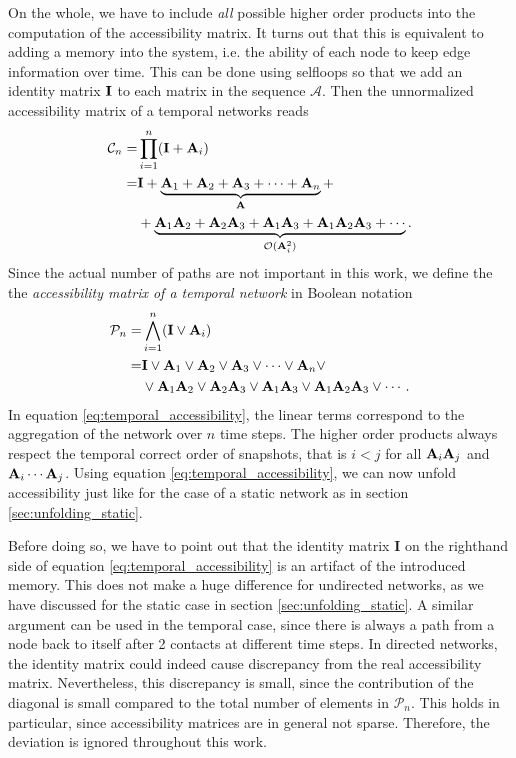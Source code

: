 On the whole, we have to include \emph{all} possible higher order products into the computation of the accessibility matrix.
It turns out that this is equivalent to adding a memory into the system, i.e. the ability of each node to keep edge information over time.
This can be done using selfloops so that we add an identity matrix $\mathbf{I}$ to each matrix in the sequence $\mathcal{A}$.
Then the unnormalized accessibility matrix of a temporal networks reads
%
\begin{align*}
\mathcal{C}_n=&\prod _{i=1} ^n (\mathbf{I} + \mathbf{A}_i ) \\
=& \mathbf{I}+\underbrace{ \mathbf{A}_1+\mathbf{A}_2+\mathbf{A}_3+\cdots + \mathbf{A}_n}_{\mathbf{A}} + \nonumber \\
&+ \underbrace{\mathbf{A}_1\mathbf{A}_2+\mathbf{A}_2\mathbf{A}_3+ \mathbf{A}_1\mathbf{A}_3+ \mathbf{A}_1\mathbf{A}_2\mathbf{A}_3 +\cdots }_{\mathcal{O}(\mathbf{A}_i ^2)}\nonumber .
\end{align*}
Since the actual number of paths are not important in this work, we define the the \emph{accessibility matrix of a temporal network} in Boolean notation
%
\begin{align}
\mathcal{P}_n=&\bigwedge _{i=1} ^n (\mathbf{I} \vee \mathbf{A}_i ) \label{eq:temporal_accessibility} \\
= & \mathbf{I}\vee \mathbf{A}_1\vee \mathbf{A}_2\vee \mathbf{A}_3\vee \cdots \vee \mathbf{A}_n \vee \nonumber \\
& \vee \mathbf{A}_1\mathbf{A}_2\vee \mathbf{A}_2\mathbf{A}_3\vee  \mathbf{A}_1\mathbf{A}_3\vee  \mathbf{A}_1\mathbf{A}_2\mathbf{A}_3 \vee \cdots . \nonumber
\end{align}
%
In equation \eqref{eq:temporal_accessibility}, the linear terms correspond to the aggregation of the network over $n$ time steps.
The higher order products always respect the temporal correct order of snapshots, that is $i<j$ for all $\mathbf{A}_i\mathbf{A}_j$ and $\mathbf{A}_i \cdots \mathbf{A}_j $.
Using equation \eqref{eq:temporal_accessibility}, we can now unfold accessibility just like for the case of a static network as in section \ref{sec:unfolding_static}.

Before doing so, we have to point out that the identity matrix $\mathbf{I}$ on the righthand side of equation \eqref{eq:temporal_accessibility} is an artifact of the introduced memory.
This does not make a huge difference for undirected networks, as we have discussed for the static case in section \ref{sec:unfolding_static}.
A similar argument can be used in the temporal case, since there is always a path from a node back to itself after 2 contacts at different time steps.
In directed networks, the identity matrix could indeed cause discrepancy from the real accessibility matrix.
Nevertheless, this discrepancy is small, since the contribution of the diagonal is small compared to the total number of elements in $\mathcal{P}_n$.
This holds in particular, since accessibility matrices are in general not sparse.
Therefore, the deviation is ignored throughout this work.

